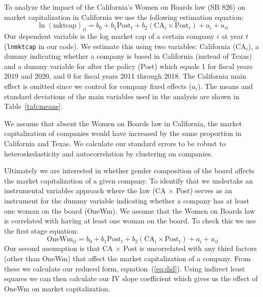 \documentclass[12pt]{article}
\begin{document}
To analyze the impact of the California's Women on Boards law (SB 826) on market capitalization in California we use the following estimation equation:
\begin{equation}
\ln(\text{mktcap})_{it} = b_0 + b_1 \text{Post}_t + b_2 (\text{CA}_i \times \text{Post}_t) + a_i + u_{it}
\label{eq:did}
\end{equation}
Our dependent variable is the log market cap of a certain company $i$ at year $t$ (\texttt{lnmktcap} in our code). We estimate this using two variables: California ($\text{CA}_i$), a dummy indicating whether a company is based in California (instead of Texas) and a dummy variable for after the policy (Post) which equals 1 for fiscal years 2019 and 2020, and 0 for fiscal years 2011 through 2018. The California main effect is omitted since we control for company fixed effects ($a_i$). The means and standard deviations of the main variables used in the analysis are shown in Table~\ref{tab:means}.

We assume that absent the Women on Boards law in California, the market capitalization of companies would have increased by the same proportion in California and Texas. We calculate our standard errors to be robust to heteroskedasticity and autocorrelation by clustering on companies.

Ultimately we are interested in whether gender composition of the board affects the market capitalization of a given company. To identify that we undertake an instrumental variables approach where the law (CA $\times$ Post) serves as an instrument for the dummy variable indicating whether a company has at least one woman on the board (OneWm). We assume that the Women on Boards law is correlated with having at least one woman on the board. To check this we use the first stage equation:
\begin{equation}
\text{OneWm}_{it} = b_0 + b_1 \text{Post}_t + b_2 (\text{CA}_i \times \text{Post}_t) + a_i + u_{it}
\label{eq:fs}
\end{equation}
Our second assumption is that CA $\times$ Post is uncorrelated with any third factors (other than OneWm) that affect the market capitalization of a company. From these we calculate our reduced form, equation~(\ref{eq:did}). Using indirect least squares we can then calculate our IV slope coefficient which gives us the effect of OneWm on market capitalization.
\end{document}
